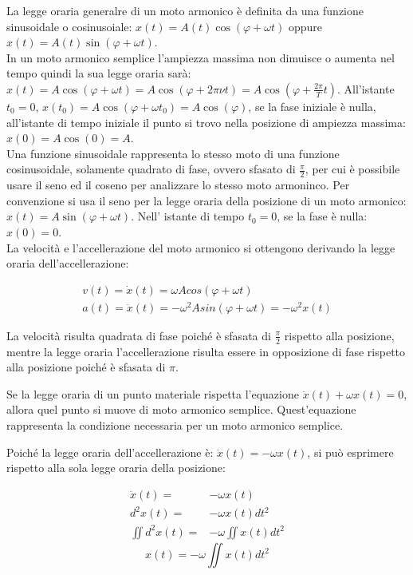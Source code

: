 \documentclass{article}
\numberwithin{equation}{subsection}
\begin{document}
La legge oraria generalre di un moto armonico è definita da 
una funzione sinusoidale o cosinusoiale: $x(t) = A(t)\cos(\varphi+\omega t)$ oppure $ x(t) = A(t)\sin(\varphi+\omega t)$.\\ 
In un moto armonico semplice l'ampiezza massima non dimuisce o 
aumenta nel tempo quindi la sua legge oraria sarà:  
$x(t) = A\cos(\varphi + \omega t) =A\cos(\varphi + 2\pi\nu t) = A\cos\left(\varphi + \displaystyle\frac{2\pi}{T}t\right)$.
All'istante $t_0 = 0$, $x(t_0) = A\cos(\varphi + \omega t_0) = 
A\cos(\varphi)$, se la fase iniziale è nulla, all'istante di 
tempo iniziale il punto si trovo nella posizione 
di ampiezza massima: $x(0) = A\cos(0) = A$. \\
Una funzione sinusoidale rappresenta lo stesso moto di una funzione cosinusoidale, solamente quadrato di fase, ovvero sfasato di $\displaystyle\frac{\pi}{2}$, 
per cui è possibile usare il seno ed il coseno per analizzare lo stesso moto armoninco. 
Per convenzione si usa il seno per la legge oraria della posizione 
di un moto armonico: $x(t) = A\sin(\varphi + \omega t)$. Nell' 
istante di tempo $t_0 = 0$, se la fase è nulla: $x(0) = 0$.\\
La velocità e l'accellerazione del moto armonico si ottengono 
derivando la legge oraria dell'accellerazione:

\begin{gather}
    v(t) = \dot x(t) = \omega Acos(\varphi+\omega t)\\
    a(t)= \ddot x(t) = -\omega^{2}Asin(\varphi+\omega t) = -\omega^{2}x(t)
\end{gather}

La velocità risulta quadrata di fase poiché è sfasata di $\displaystyle\frac{\pi}{2}$ rispetto alla posizione, mentre la legge oraria l'accellerazione 
risulta essere in opposizione di fase rispetto alla posizione poiché è sfasata di $\pi$. 

Se la legge oraria di un punto materiale rispetta l'equazione $\ddot x(t)+\omega x(t)=0$, allora quel punto si muove di moto armonico semplice. Quest'equazione 
rappresenta la condizione necessaria per un moto armonico semplice. 

Poiché la legge oraria dell'accellerazione è: $\ddot x(t) = -\omega x(t)$, 
si può esprimere rispetto alla sola legge oraria della posizione:

\begin{align*}
    \ddot x(t) =& -\omega x(t) \\
    d^{2}x(t) =& -\omega x(t)dt^{2} \\
    \displaystyle\iint d^{2}x(t)=& -\omega\iint x(t)dt^{2} 
\end{align*}
\begin{equation}
    \displaystyle x(t) = -\omega\iint x(t)dt^{2}
\end{equation}
\end{document}
